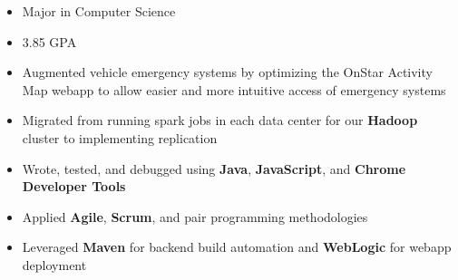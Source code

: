 \documentclass[10pt,a4paper,ragged2e]{altacv}
\begin{document}
\tagline{}

\begin{fullwidth}
\makecvheader
\end{fullwidth}



\begin{itemize}
    \item Major in Computer Science
    \smallskip
    \item 3.85 GPA
\end{itemize}



\begin{itemize}
\item Augmented vehicle emergency systems by optimizing the OnStar Activity Map webapp to allow easier and more intuitive access of emergency systems
\smallskip
\item Migrated from running spark jobs in each data center for our \textbf{Hadoop} cluster to implementing replication
\smallskip
\item Wrote, tested, and debugged using \textbf{Java}, \textbf{JavaScript}, and \textbf{Chrome Developer Tools}
\smallskip
\item Applied \textbf{Agile}, \textbf{Scrum}, and pair programming methodologies
\smallskip
\item Leveraged \textbf{Maven} for backend build automation and \textbf{WebLogic} for webapp deployment
\end{itemize}
\end{document}
